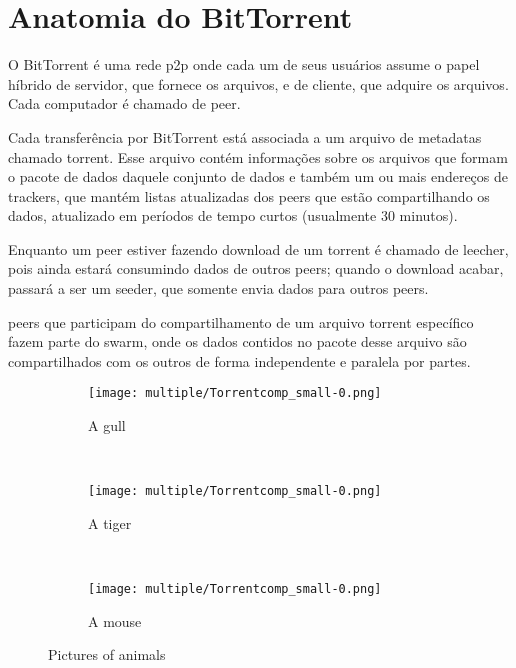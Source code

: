 
\chapter{Anatomia do BitTorrent}

O BitTorrent é uma rede \gls{p2p} onde cada um de seus usuários assume o papel híbrido
de servidor, que fornece os arquivos, e de cliente, que adquire os arquivos. Cada
computador é chamado de \gls{peer}.

Cada transferência por BitTorrent está associada a um arquivo de \glspl{metadata}
chamado \gls{torrent}. Esse arquivo contém informações sobre os arquivos que formam o
pacote de dados daquele conjunto de dados e também um ou mais endereços de
\glspl*{tracker}, que mantém listas atualizadas dos \glspl*{peer} que estão
compartilhando os dados, atualizado em períodos de tempo curtos (usualmente 30 minutos).

Enquanto um \gls*{peer} estiver fazendo download de um \gls*{torrent} é chamado de
\gls{leecher}, pois ainda estará consumindo dados de outros \glspl*{peer}; quando o
download acabar, passará a ser um \gls{seeder}, que somente envia dados para outros
\glspl*{peer}.

\Glspl*{peer} que participam do compartilhamento de um arquivo \gls*{torrent} específico
fazem parte do \gls{swarm}, onde os dados contidos no pacote desse arquivo são
compartilhados com os outros de forma independente e paralela por partes.

\begin{figure}
        \centering
        \begin{subfigure}[b]{0.3\textwidth}
                \texttt{[image: multiple/Torrentcomp\_small-0.png]}
                \caption{A gull}
                \label{fig:gull}
        \end{subfigure}%
        ~ %
        \begin{subfigure}[b]{0.3\textwidth}
                \texttt{[image: multiple/Torrentcomp\_small-0.png]}
                \caption{A tiger}
                \label{fig:tiger}
        \end{subfigure}
        ~ %
        \begin{subfigure}[b]{0.3\textwidth}
                \texttt{[image: multiple/Torrentcomp\_small-0.png]}
                \caption{A mouse}
                \label{fig:mouse}
        \end{subfigure}
        \caption{Pictures of animals}\label{fig:animals}
\end{figure}


